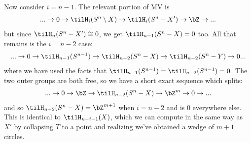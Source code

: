 \begin{homework}[e]
\begin{prf}
    Now consider $i = n - 1$. The relevant portion of MV is
    \begin{align*}
      ...\to 0 \to \tilH_i(S^n \setminus X) \to \tilH_i(S^n - X') \to \bZ \to ...
    \end{align*}
    but since $\tilH_n(S^n - X') \cong 0$, we get $\tilH_{n-1}(S^n - X) = 0$ too. All that remains is the $i = n-2$ case:
    \begin{align*}
      ... \to 0 \to \tilH_{n-1}(S^{n-1}) \to \tilH_{n-2}(S^{n} - X) \to \tilH_{n - 2}(S^n - Y) \to 0 ...
    \end{align*}
    where we have used the facts that $\tilH_{n-1}(S^{n-1}) = \tilH_{n-2}(S^{n-1}) = 0$. The two outer groups are both free, so we have a short exact sequence which splits:
    \begin{align*}
      ... \to 0 \to \bZ \to \tilH_{n-2}(S^n - X) \to \bZ^m \to 0 \to ...
    \end{align*}
    and so $\tilH_{n-2}(S^n - X) = \bZ^{m+1}$ when $i = n - 2$ and is 0 everywhere else. This is identical to $\tilH_{n - i - 1}(X)$, which we can compute in the same way as $X'$ by collapsing $T$ to a point and realizing we've obtained a wedge of $m + 1$ circles.
  \end{prf}
\end{homework}

